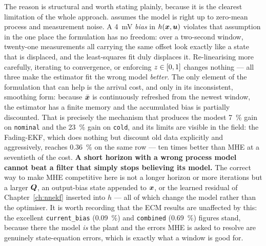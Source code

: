 The reason is structural and worth stating plainly, because it is the clearest limitation of the
whole approach.   assumes the model is right up to zero-mean process and
measurement noise.  A \SI{4}{\milli\volt} \emph{bias} in $h(\bm{x},\bm{u})$ violates that assumption in
the one place the formulation has no freedom: over a two-second window, twenty-one measurements all
carrying the same offset look exactly like a state that is displaced, and the least-squares fit
duly displaces it.  Re-linearising more carefully, iterating to convergence, or enforcing
$z\in[0,1]$ changes nothing --- all three make the estimator fit the wrong model \emph{better}.
The only element of the formulation that can help is the arrival cost, and only in its
inconsistent, smoothing form: because $\bar{\bm{x}}$ is continuously refreshed from the newest window,
the estimator has a finite memory and the accumulated bias is partially discounted.  That is
precisely the mechanism that produces the modest \SI{7}{\percent} gain on \texttt{nominal} and the
\SI{23}{\percent} gain on \texttt{cold}, and its limits are visible in the field: the Fading-EKF,
which does nothing but discount old data explicitly and aggressively, reaches \SI{0.36}{\percent}
on the same row --- ten times better than MHE at a seventieth of the cost.  \textbf{A short horizon
with a wrong process model cannot beat a filter that simply stops believing its model.}  The
correct way to make MHE competitive here is not a longer horizon or more iterations but a larger
$\bm{Q}$, an output-bias state appended to $\bm{x}$, or the learned residual of
Chapter~\ref{ch:nnekf} inserted into $h$ --- all of which change the model rather than the
optimiser.  It is worth recording that the ECM results are unaffected by this: the excellent
\texttt{current\_bias} (\SI{0.09}{\percent}) and \texttt{combined} (\SI{0.69}{\percent}) figures
stand, because there the model \emph{is} the plant and the errors MHE is asked to resolve are
genuinely state-equation errors, which is exactly what a window is good for.

